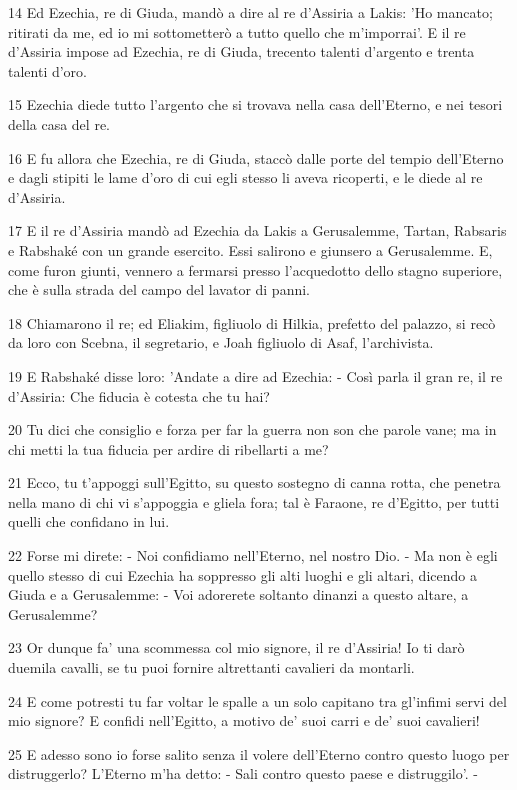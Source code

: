 \par 14 Ed Ezechia, re di Giuda, mandò a dire al re d'Assiria a Lakis: 'Ho mancato; ritirati da me, ed io mi sottometterò a tutto quello che m'imporrai'. E il re d'Assiria impose ad Ezechia, re di Giuda, trecento talenti d'argento e trenta talenti d'oro.
\par 15 Ezechia diede tutto l'argento che si trovava nella casa dell'Eterno, e nei tesori della casa del re.
\par 16 E fu allora che Ezechia, re di Giuda, staccò dalle porte del tempio dell'Eterno e dagli stipiti le lame d'oro di cui egli stesso li aveva ricoperti, e le diede al re d'Assiria.
\par 17 E il re d'Assiria mandò ad Ezechia da Lakis a Gerusalemme, Tartan, Rabsaris e Rabshaké con un grande esercito. Essi salirono e giunsero a Gerusalemme. E, come furon giunti, vennero a fermarsi presso l'acquedotto dello stagno superiore, che è sulla strada del campo del lavator di panni.
\par 18 Chiamarono il re; ed Eliakim, figliuolo di Hilkia, prefetto del palazzo, si recò da loro con Scebna, il segretario, e Joah figliuolo di Asaf, l'archivista.
\par 19 E Rabshaké disse loro: 'Andate a dire ad Ezechia: - Così parla il gran re, il re d'Assiria: Che fiducia è cotesta che tu hai?
\par 20 Tu dici che consiglio e forza per far la guerra non son che parole vane; ma in chi metti la tua fiducia per ardire di ribellarti a me?
\par 21 Ecco, tu t'appoggi sull'Egitto, su questo sostegno di canna rotta, che penetra nella mano di chi vi s'appoggia e gliela fora; tal è Faraone, re d'Egitto, per tutti quelli che confidano in lui.
\par 22 Forse mi direte: - Noi confidiamo nell'Eterno, nel nostro Dio. - Ma non è egli quello stesso di cui Ezechia ha soppresso gli alti luoghi e gli altari, dicendo a Giuda e a Gerusalemme: - Voi adorerete soltanto dinanzi a questo altare, a Gerusalemme?
\par 23 Or dunque fa' una scommessa col mio signore, il re d'Assiria! Io ti darò duemila cavalli, se tu puoi fornire altrettanti cavalieri da montarli.
\par 24 E come potresti tu far voltar le spalle a un solo capitano tra gl'infimi servi del mio signore? E confidi nell'Egitto, a motivo de' suoi carri e de' suoi cavalieri!
\par 25 E adesso sono io forse salito senza il volere dell'Eterno contro questo luogo per distruggerlo? L'Eterno m'ha detto: - Sali contro questo paese e distruggilo'. -
